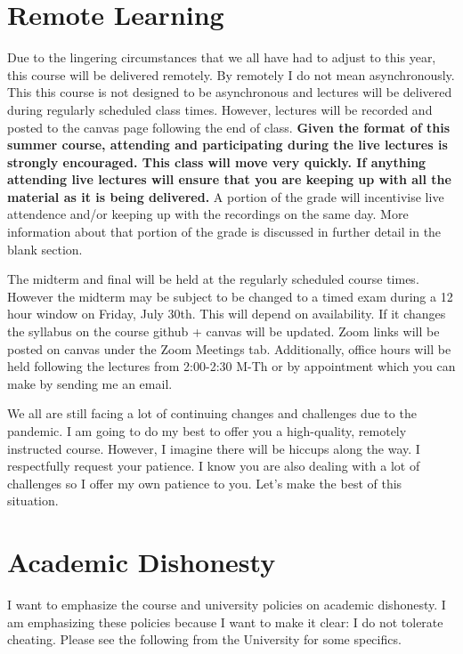 \documentclass[11pt]{article}
\begin{document}
	
	
	
	
	\section*{Remote Learning}
	
Due to the lingering circumstances that we all have had to adjust to this year, this course will be delivered remotely. By remotely I do not mean asynchronously. This this course is not designed to be asynchronous and lectures will be delivered during regularly scheduled class times. However, lectures will be recorded and posted to the canvas page following the end of class. \textbf{Given the format of this summer course, attending and participating during the live lectures is strongly encouraged. This class will move very quickly. If anything attending live lectures will ensure that you are keeping up with all the material as it is being delivered.} A portion of the grade will incentivise live attendence and/or keeping up with the recordings on the same day. More information about that portion of the grade is discussed in further detail in the blank section.

The midterm and final will be held at the regularly scheduled course times. However the midterm may be subject to be changed to a timed exam during a 12 hour window on Friday, July 30th. This will depend on availability. If it changes the syllabus on the course github + canvas will be updated. Zoom links will be posted on canvas under the Zoom Meetings tab. Additionally, office hours will be held following the lectures from 2:00-2:30 M-Th or by appointment which you can make by sending me an email.
	
We all are still facing a lot of continuing changes and challenges due to the pandemic. I am going to do my best to offer you a high-quality, remotely instructed course. However, I imagine there will be hiccups along the way. I respectfully request your patience. I know you are also dealing with a lot of challenges so I offer my own patience to you. Let's make the best of this situation.

\section*{Academic Dishonesty}
 I want to emphasize the course and university policies on academic dishonesty. I am emphasizing these policies because I want to make it clear: I do not tolerate cheating.   Please see the following from the University for some specifics.
	
\end{document}
